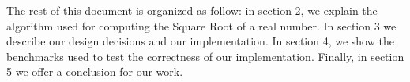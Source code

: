 The rest of this document is organized as follow: in section 2, we explain the algorithm used for computing the Square Root of a real number. In section 3 we describe our design decisions and our implementation. In section 4, we show the benchmarks used to test the correctness of our implementation. Finally, in section 5 we offer a conclusion for our work.

\clearpage
